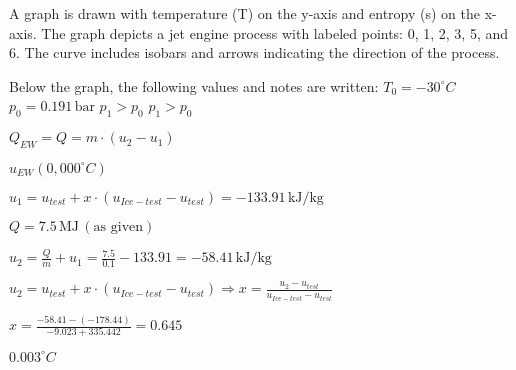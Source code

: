 A graph is drawn with temperature (T) on the y-axis and entropy (s) on the x-axis. The graph depicts a jet engine process with labeled points: 0, 1, 2, 3, 5, and 6. The curve includes isobars and arrows indicating the direction of the process.  

Below the graph, the following values and notes are written:  
\( T_0 = -30^\circ C \)  
\( p_0 = 0.191 \, \text{bar} \)  
\( p_1 > p_0 \)  
\( p_1 > p_0 \)

\( Q_{EW} = Q = m \cdot (u_2 - u_1) \)  

\( u_{EW}(0,000^\circ C) \)  

\( u_1 = u_{test} + x \cdot (u_{Ice-test} - u_{test}) = -133.91 \, \text{kJ/kg} \)  

\( Q = 7.5 \, \text{MJ} \, (\text{as given}) \)  

\( u_2 = \frac{Q}{m} + u_1 = \frac{7.5}{0.1} - 133.91 = -58.41 \, \text{kJ/kg} \)  

\( u_2 = u_{test} + x \cdot (u_{Ice-test} - u_{test}) \Rightarrow x = \frac{u_2 - u_{test}}{u_{Ice-test} - u_{test}} \)  

\( x = \frac{-58.41 - (-178.44)}{-9.023 + 335.442} = 0.645 \)  

\( 0.003^\circ C \)